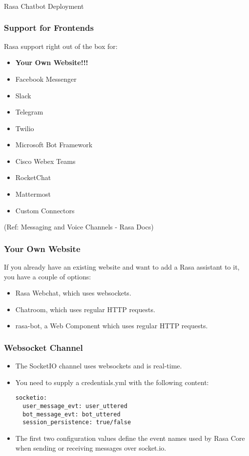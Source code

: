 \begin{frame}[fragile]\frametitle{}
\begin{center}
{\Large Rasa Chatbot Deployment}

\end{center}
\end{frame}


 \begin{frame}[fragile]\frametitle{Support for Frontends}
 Rasa support right out of the box for:
 \begin{itemize}
\item {\bf Your Own Website!!!}
\item Facebook Messenger
\item Slack
\item Telegram
\item Twilio
\item Microsoft Bot Framework
\item Cisco Webex Teams
\item RocketChat
\item Mattermost
\item Custom Connectors
\end{itemize}

{\tiny (Ref: Messaging and Voice Channels - Rasa Docs)}

\end{frame}


 \begin{frame}[fragile]\frametitle{Your Own Website}
 If you already have an existing website and want to add a Rasa assistant to it, you have a couple of options:
 \begin{itemize}
\item Rasa Webchat, which uses websockets.
\item Chatroom, which uses regular HTTP requests.
\item rasa-bot, a Web Component which uses regular HTTP requests.
\end{itemize}

\end{frame} 

 \begin{frame}[fragile]\frametitle{Websocket Channel}
 \begin{itemize}
\item The SocketIO channel uses websockets and is real-time. 
\item You need to supply a credentials.yml with the following content:
\begin{lstlisting}
socketio:
  user_message_evt: user_uttered
  bot_message_evt: bot_uttered
  session_persistence: true/false
\end{lstlisting}
\item The first two configuration values define the event names used by Rasa Core when sending or receiving messages over socket.io.
\end{itemize}

\end{frame} 

